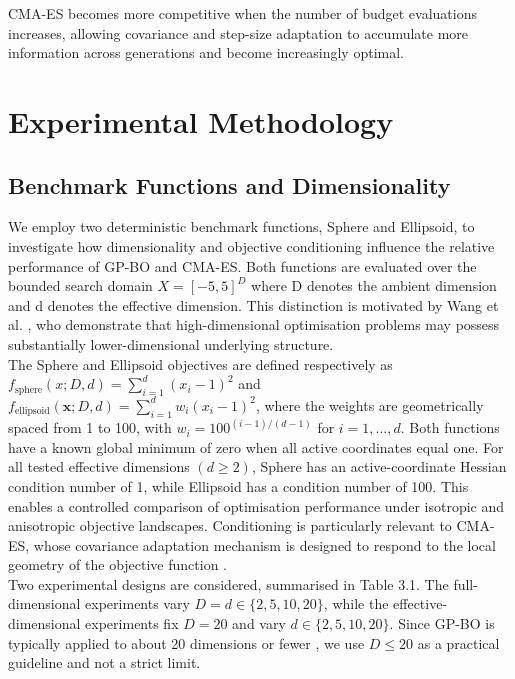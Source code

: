 \documentclass[11pt]{article}
\begin{document}
CMA-ES becomes more competitive when the number of budget evaluations increases, allowing covariance and step-size adaptation to accumulate more information across generations and become increasingly optimal.

\section{Experimental Methodology}

\subsection{Benchmark Functions and Dimensionality}
We employ two deterministic benchmark functions, Sphere and Ellipsoid, to investigate how dimensionality and objective conditioning influence the relative performance of GP-BO and CMA-ES. Both functions are evaluated over the bounded search domain $X=[-5,5]^D$ where D denotes the ambient dimension and d denotes the effective dimension. This distinction is motivated by Wang et al. \cite{wang2016billion}, who demonstrate that high-dimensional optimisation problems may possess substantially lower-dimensional underlying structure. \\

\noindent The Sphere and Ellipsoid objectives are defined respectively as $f_{\text{sphere}}(x; D, d) = \sum_{i=1}^{d} (x_i - 1)^2$ and $f_{\text{ellipsoid}}(\mathbf{x}; D, d) = \sum_{i=1}^{d} w_i (x_i - 1)^2$, where the weights are geometrically spaced from 1 to 100, with $w_i = 100^{(i-1)/(d-1)}$ for $i=1,\ldots,d$. Both functions have a known global minimum of zero when all active coordinates equal one. For all tested effective dimensions $(d\geq 2)$, Sphere has an active-coordinate Hessian condition number of 1, while Ellipsoid has a condition number of 100. This enables a controlled comparison of optimisation performance under isotropic and anisotropic objective landscapes. Conditioning is particularly relevant to CMA-ES, whose covariance adaptation mechanism is designed to respond to the local geometry of the objective function \cite{hansen2023cma}. \\

\noindent Two experimental designs are considered, summarised in Table 3.1. The full-dimensional experiments vary $D = d \in \{2, 5, 10, 20\}$, while the effective-dimensional experiments fix $D = 20$ and vary $d \in \{2, 5, 10, 20\}$. Since GP-BO is typically applied to about 20 dimensions or fewer \cite{frazier2018tutorial}, we use $D\leq 20$ as a practical guideline and not a strict limit. \\
\end{document}
